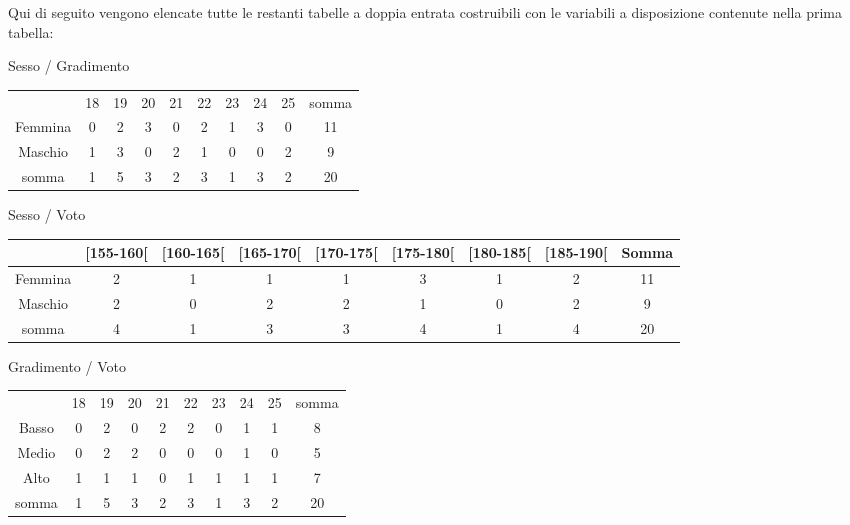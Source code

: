 Qui di seguito vengono elencate tutte le restanti tabelle a doppia entrata 
costruibili con le variabili a disposizione contenute nella prima tabella:

\begin{center}
Sesso / Gradimento\\
\begin{tabular}{ccccccccc|c}
\hline
        & 18 &  19 &  20 &  21 &   22 &  23 &  24 &  25 &  somma\\ 
Femmina &  0 &   2 &   3 &   0 &    2 &   1 &   3 &   0 &  11\\
Maschio &  1 &   3 &   0 &   2 &    1 &   0 &   0 &   2 &   9\\
\hline
somma   &  1 &   5 &   3 &   2 &    3 &   1 &   3 &   2 &  20\\
\end{tabular}

\vspace{1em}
Sesso / Voto\\
\begin{tabular}{cccccccc|c} 
        \hline
&{\scriptsize [155-160[} & {\scriptsize [160-165[}
&{\scriptsize [165-170[} & {\scriptsize [170-175[}
&{\scriptsize [175-180[} & {\scriptsize [180-185[}
&{\scriptsize [185-190[} & {\scriptsize Somma}\\ 
\hline 
Femmina &  2&  1&  1&  1&  3&  1&  2&  11\\
Maschio &  2&  0&  2&  2&  1&  0&  2&   9\\
\hline
somma   &  4&  1&  3&  3&  4&  1&  4&  20\\
\end{tabular}

\vspace{1em}
Gradimento / Voto\\ 
\begin{tabular}{ccccccccc|c}
        \hline
      &  18 &  19 &  20 &  21 &  22 &  23 &  24 &  25 & somma\\ 
Basso &   0 &   2 &   0 &   2 &   2 &   0 &   1 &   1 &   8\\
Medio &   0 &   2 &   2 &   0 &   0 &   0 &   1 &   0 &   5\\
Alto  &   1 &   1 &   1 &   0 &   1 &   1 &   1 &   1 &   7\\
\hline
somma &   1 &   5 &   3 &   2 &   3 &   1 &   3 &   2 &  20\\
\end{tabular}


\end{center}
